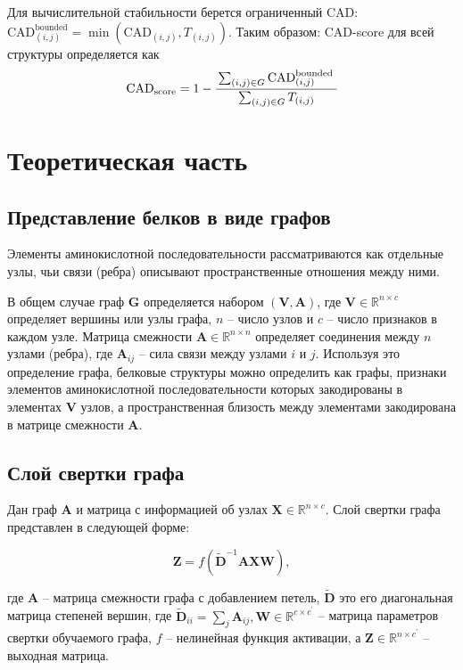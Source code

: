 \documentclass[12pt,twosides]{article}
\begin{document}
		Для вычислительной стабильности берется ограниченный CAD: $\mathrm{CAD}_{(i, j)}^{\text {bounded}}=\min \left(\mathrm{CAD}_{(i, j)}, T_{(i, j)}\right)$. Таким образом:
		CAD-score для всей структуры определяется как
		$$\mathrm{CAD}_\text{score}=1-\cfrac{\sum_{(i, j) \in G} \mathrm{CAD}_{(i, j)}^{\text {bounded }}}{\sum_{(i, j) \in G} T_{(i, j)}}$$
	
	\section{Теоретическая часть}
	
		\subsection{Представление белков в виде графов}
	  Элементы аминокислотной последовательности рассматриваются как отдельные узлы, чьи связи (ребра) описывают пространственные отношения между ними. 
	
	В общем случае граф $\mathbf{G}$ определяется набором $\mathbf{(V, A)}$, где $\mathbf{V}\in \mathbb{R}^{n \times c}$ определяет вершины или узлы графа, $n$ – число узлов и $c$ – число признаков в каждом узле. Матрица смежности $\mathbf{A}\in \mathbb{R}^{n \times n}$ определяет соединения между $n$ узлами (ребра), где $\mathbf{A}_{ij}$ – сила связи между узлами $i$ и $j$. Используя это определение графа, белковые структуры можно определить как графы, признаки элементов аминокислотной последовательности которых закодированы в элементах $\mathbf{V}$ узлов, а пространственная близость между элементами закодирована в матрице смежности $\mathbf{A}$.
	
		\subsection{Слой свертки графа}
	Дан граф $\mathbf{A}$ и матрица с информацией об узлах $\mathbf{X} \in \mathbb{R}^{n \times c}$.  Слой свертки графа представлен в следующей форме:
	
	$$\mathbf{Z}=f\left(\tilde{\mathbf{D}}^{-1} \mathbf{A} \mathbf{X} \mathbf{W}\right),$$
	
	где $\mathbf{A}$ – матрица смежности графа с добавлением петель, $\tilde{\mathbf{D}}$ это его диагональная матрица степеней вершин, где $\tilde{\mathbf{D}}_{i i}=\sum_{j} \mathbf{A}_{i j}, \mathbf{W} \in \mathbb{R}^{c \times c^{\prime}}$ – матрица параметров свертки обучаемого графа, $f$ – нелинейная функция активации, а $\mathbf{Z} \in \mathbb{R}^{n \times c^{\prime}}$ – выходная матрица.
	
\end{document}
